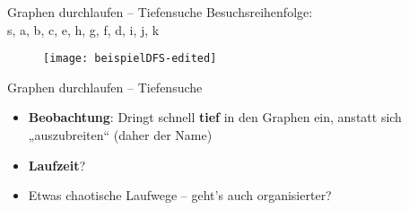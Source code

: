 \begin{frame}{Graphen durchlaufen – Tiefensuche}
	\solutionheading
	Besuchsreihenfolge: \\ s, a, b, c, e, h, g, f, d, i, j, k
	\vspace{-.4\baselineskip}
	\begin{figure}[htp]
		\centering
		\texttt{[image: beispielDFS-edited]}
	\end{figure}
\end{frame}

\begin{frame}[t]{Graphen durchlaufen – Tiefensuche}
	\begin{itemize}
		\item<+-> \textbf{Beobachtung}: Dringt schnell \textbf{tief} in den Graphen ein, anstatt sich „auszubreiten“ (daher der Name)
		\item<+-> \textbf{Laufzeit}? \visible<+->{$\Theta(n+m)$} \\ 
		\item<+-> Etwas chaotische Laufwege -- geht's auch organisierter?
	\end{itemize}
\end{frame}

